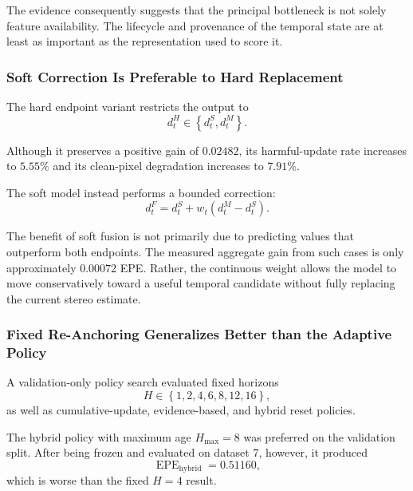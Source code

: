 \documentclass[11pt,a4paper]{article}
\begin{document}
The evidence consequently suggests that the principal bottleneck is not solely feature
availability. The lifecycle and provenance of the temporal state are at least as important
as the representation used to score it.

\subsubsection{Soft Correction Is Preferable to Hard Replacement}

The hard endpoint variant restricts the output to
\begin{equation}
    d_t^{H}
    \in
    \left\{
        d_t^{S},
        d_t^{M}
    \right\}.
\end{equation}

Although it preserves a positive gain of \(0.02482\), its harmful-update rate increases
to \(5.55\%\) and its clean-pixel degradation increases to \(7.91\%\).

The soft model instead performs a bounded correction:
\begin{equation}
    d_t^{F}
    =
    d_t^{S}
    +
    w_t
    \left(
        d_t^{M}-d_t^{S}
    \right).
\end{equation}

The benefit of soft fusion is not primarily due to predicting values that outperform both
endpoints. The measured aggregate gain from such cases is only approximately
\(0.00072\) EPE. Rather, the continuous weight allows the model to move conservatively
toward a useful temporal candidate without fully replacing the current stereo estimate.

\subsubsection{Fixed Re-Anchoring Generalizes Better than the Adaptive Policy}

A validation-only policy search evaluated fixed horizons
\begin{equation}
    H
    \in
    \left\{
        1,2,4,6,8,12,16
    \right\},
\end{equation}
as well as cumulative-update, evidence-based, and hybrid reset policies.

The hybrid policy with maximum age \(H_{\max}=8\) was preferred on the validation split.
After being frozen and evaluated on dataset 7, however, it produced
\begin{equation}
    \operatorname{EPE}_{\mathrm{hybrid}}
    =
    0.51160,
\end{equation}
which is worse than the fixed \(H=4\) result.
\end{document}
